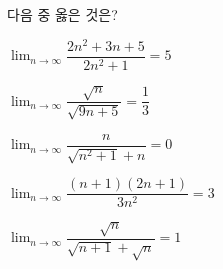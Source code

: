 다음 중 옳은 것은?
\begin{choicesii}{\rule[-3ex]{0pt}{8ex}$\displaystyle\lim_{n\to\infty}\dfrac{2n^2+3n+5}{2n^2+1}=5$}{\rule[-3ex]{0pt}{8ex}$\displaystyle\lim_{n\to\infty}\dfrac{\sqrt{n}}{\sqrt{9n+5}}=\dfrac{1}{3}$}{\rule[-3ex]{0pt}{8ex}$\displaystyle\lim_{n\to\infty}\dfrac{n}{\sqrt{n^2+1}+n}=0$}{\rule[-3ex]{0pt}{8ex}$\displaystyle\lim_{n\to\infty}\dfrac{(n+1)(2n+1)}{3n^2}=3$}{\rule[-3ex]{0pt}{8ex}$\displaystyle\lim_{n\to\infty}\dfrac{\sqrt{n}}{\sqrt{n+1}+\sqrt{n}}=1$}\end{choicesii}
